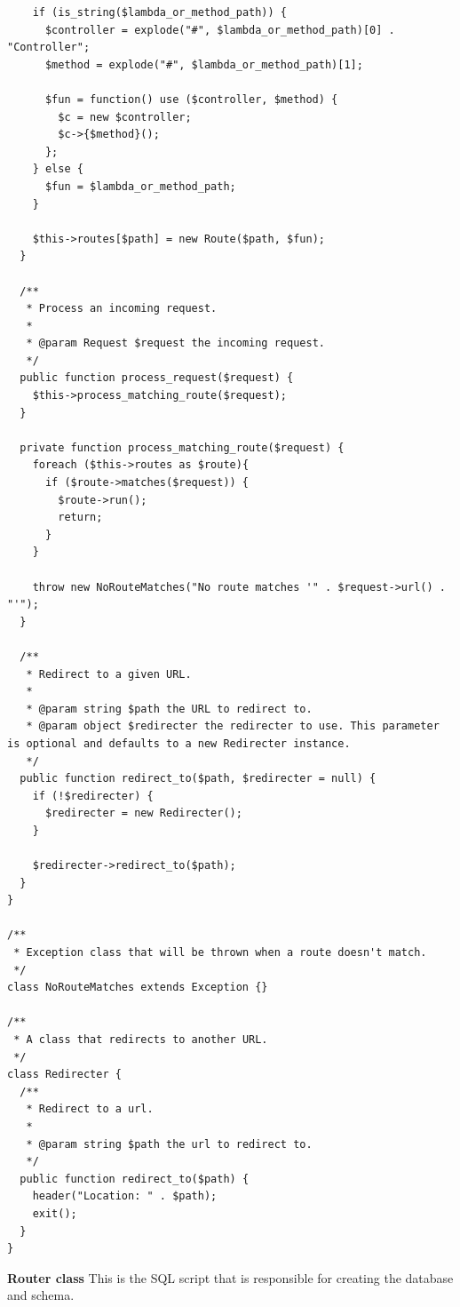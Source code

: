 \documentclass[12pt]{article}
\begin{document}
\begin{verbatim}
    if (is_string($lambda_or_method_path)) {
      $controller = explode("#", $lambda_or_method_path)[0] . "Controller";
      $method = explode("#", $lambda_or_method_path)[1];

      $fun = function() use ($controller, $method) {
        $c = new $controller;
        $c->{$method}();
      };
    } else {
      $fun = $lambda_or_method_path;
    }

    $this->routes[$path] = new Route($path, $fun);
  }

  /**
   * Process an incoming request.
   *
   * @param Request $request the incoming request.
   */
  public function process_request($request) {
    $this->process_matching_route($request);
  }

  private function process_matching_route($request) {
    foreach ($this->routes as $route){
      if ($route->matches($request)) {
        $route->run();
        return;
      }
    }

    throw new NoRouteMatches("No route matches '" . $request->url() . "'");
  }

  /**
   * Redirect to a given URL.
   *
   * @param string $path the URL to redirect to.
   * @param object $redirecter the redirecter to use. This parameter is optional and defaults to a new Redirecter instance.
   */
  public function redirect_to($path, $redirecter = null) {
    if (!$redirecter) {
      $redirecter = new Redirecter();
    }

    $redirecter->redirect_to($path);
  }
}

/**
 * Exception class that will be thrown when a route doesn't match.
 */
class NoRouteMatches extends Exception {}

/**
 * A class that redirects to another URL.
 */
class Redirecter {
  /**
   * Redirect to a url.
   *
   * @param string $path the url to redirect to.
   */
  public function redirect_to($path) {
    header("Location: " . $path);
    exit();
  }
}
\end{verbatim}
\textbf{Router class}
This is the SQL script that is responsible for creating the database and schema.
\end{document}

